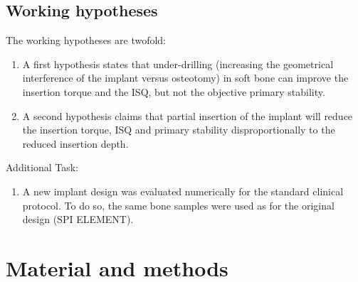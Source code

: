 \documentclass[12pt, a4paper, twoside]{report}
\begin{document}
\section{Working hypotheses}
%
The working hypotheses are twofold:
\begin{enumerate}
\item A first hypothesis states that under-drilling (increasing the geometrical interference of the implant versus osteotomy) in soft bone can improve the insertion torque and the ISQ, but not the objective primary stability.
\item A second hypothesis claims that partial insertion of the implant will reduce the insertion torque, ISQ and primary stability disproportionally to the reduced insertion depth.
\end{enumerate}
%
%
Additional Task:
\begin{enumerate}
\item A new implant design was evaluated numerically for the standard clinical protocol. To do so, the same bone samples were used as for the original design (SPI ELEMENT).
\end{enumerate}
%
%
%
%
%
%
%
\chapter{Material and methods}
%
%
%
\end{document}
